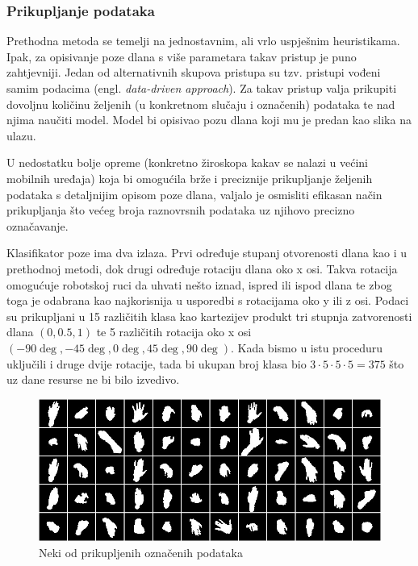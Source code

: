 \documentclass[times, utf8, diplomski, numeric]{fer}
\begin{document}
\subsubsection{Prikupljanje podataka}
Prethodna metoda se temelji na jednostavnim, ali vrlo uspješnim heuristikama. Ipak, za opisivanje poze dlana s više parametara takav pristup je puno zahtjevniji. Jedan od alternativnih skupova pristupa su tzv. pristupi vođeni samim podacima (engl. \textit{data-driven approach}). Za takav pristup valja prikupiti dovoljnu količinu željenih (u konkretnom slučaju i označenih) podataka te nad njima naučiti model. Model bi opisivao pozu dlana koji mu je predan kao slika na ulazu.

U nedostatku bolje opreme (konkretno žiroskopa kakav se nalazi u većini mobilnih uređaja) koja bi omogućila brže i preciznije prikupljanje željenih podataka s detaljnijim opisom poze dlana, valjalo je osmisliti efikasan način prikupljanja što većeg broja raznovrsnih podataka uz njihovo precizno označavanje.

Klasifikator poze ima dva izlaza. Prvi određuje stupanj otvorenosti dlana kao i u prethodnoj metodi, dok drugi određuje rotaciju dlana oko x osi. Takva rotacija omogućuje robotskoj ruci da uhvati nešto iznad, ispred ili ispod dlana te zbog toga je odabrana kao najkorisnija u usporedbi s rotacijama oko y ili z osi. Podaci su prikupljani u 15 različitih klasa kao kartezijev produkt tri stupnja zatvorenosti dlana $ (0,0.5,1)$ te 5 različitih rotacija oko x osi $(-90\deg, -45\deg, 0\deg, 45\deg, 90\deg)$. Kada bismo u istu proceduru uključili i druge dvije rotacije, tada bi ukupan broj klasa bio $3\cdot5\cdot5\cdot5 =375$ što uz dane resurse ne bi bilo izvedivo.

\begin{figure}[h!]
\centering
\includegraphics[width = 1.0\textwidth]{detekcija/dataset}
\caption{Neki od prikupljenih označenih podataka} \label{covnet-dataset}
\end{figure}
\end{document}
